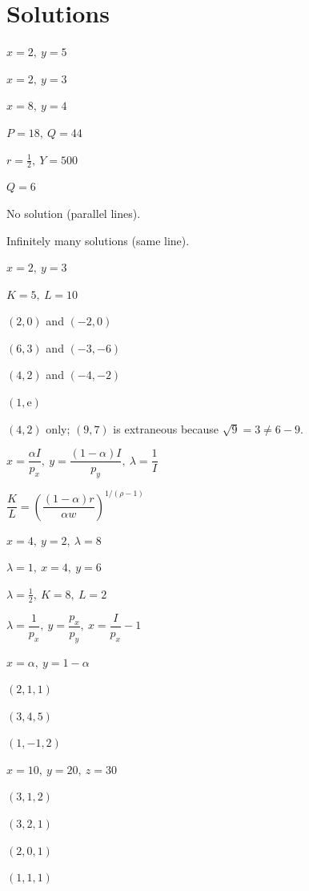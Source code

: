 \section{Solutions}

\begin{solutions}
  \item $x=2,\ y=5$
  \item $x=2,\ y=3$
  \item $x=8,\ y=4$
  \item $P=18,\ Q=44$
  \item $r=\tfrac12,\ Y=500$
  \item $Q=6$
  \item No solution (parallel lines).
  \item Infinitely many solutions (same line).
  \item $x=2,\ y=3$
  \item $K=5,\ L=10$
  \item $(2,0)$ and $(-2,0)$
  \item $(6,3)$ and $(-3,-6)$
  \item $(4,2)$ and $(-4,-2)$
  \item $(1,\mathrm{e})$
  \item $(4,2)$ only; $(9,7)$ is extraneous because
        $\sqrt{9}=3\neq 6-9$.
  \item $x=\dfrac{\alpha I}{p_{x}},\ y=\dfrac{(1-\alpha)I}{p_{y}},\
        \lambda=\dfrac{1}{I}$
  \item $\dfrac{K}{L}=\left(\dfrac{(1-\alpha)r}{\alpha w}\right)^{1/(\rho-1)}$
  \item $x=4,\ y=2,\ \lambda=8$
  \item $\lambda=1,\ x=4,\ y=6$
  \item $\lambda=\tfrac12,\ K=8,\ L=2$
  \item $\lambda=\dfrac{1}{p_{x}},\ y=\dfrac{p_{x}}{p_{y}},\
        x=\dfrac{I}{p_{x}}-1$
  \item $x=\alpha,\ y=1-\alpha$
  \item $(2,1,1)$
  \item $(3,4,5)$
  \item $(1,-1,2)$
  \item $x=10,\ y=20,\ z=30$
  \item $(3,1,2)$
  \item $(3,2,1)$
  \item $(2,0,1)$
  \item $(1,1,1)$
\end{solutions}

